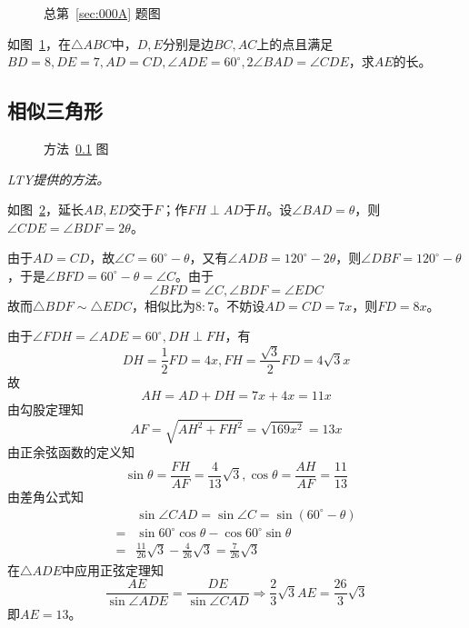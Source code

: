 

\begin{figure}[htbp]
  \centering {}
  \caption{总第~\ref{sec:000A} 题图} \label{fig:000A}
\end{figure}

如图~\ref{fig:000A}，在$\triangle ABC$中，$D, E$分别是边$BC, AC$上的点且满足$BD = 8, DE = 7, AD = CD, \angle ADE = 60^\circ, 2\angle BAD = \angle CDE$，求$AE$的长。



\subsection{相似三角形} \label{subsec:000A-sim}

\begin{figure}[htbp]
  \centering {}
  \caption{方法~\ref{subsec:000A-sim} 图} \label{fig:000A-sim}
\end{figure}

\emph{LTY提供的方法。}

如图~\ref{fig:000A-sim}，延长$AB, ED$交于$F$；作$FH \perp AD$于$H$。设$\angle BAD = \theta$，则$\angle CDE = \angle BDF = 2\theta$。

由于$AD = CD$，故$\angle C = 60^\circ - \theta$，又有$\angle ADB = 120^\circ - 2\theta$，则$\angle DBF = 120^\circ - \theta$，于是$\angle BFD = 60^\circ - \theta = \angle C$。由于
\[ \angle BFD = \angle C, \angle BDF = \angle EDC \]
故而$\triangle BDF \sim \triangle EDC$，相似比为$8:7$。不妨设$AD = CD = 7x$，则$FD = 8x$。

由于$\angle FDH = \angle ADE = 60^\circ, DH \perp FH$，有
\[ DH = \frac12FD = 4x, FH = \frac{\sqrt3}2FD = 4\sqrt3x \]
故
\[ AH = AD + DH = 7x + 4x = 11x \]
由勾股定理知
\[ AF = \sqrt{AH^2 + FH^2} = \sqrt{169x^2} = 13x \]
由正余弦函数的定义知
\[ \sin\theta = \frac{FH}{AF} = \frac4{13}\sqrt3, \cos\theta = \frac{AH}{AF} = \frac{11}{13} \]
由差角公式知
\begin{align*}
  & \sin\angle CAD = \sin\angle C = \sin(60^\circ - \theta) \\
  ={}& \sin60^\circ\cos\theta - \cos60^\circ\sin\theta \\
  ={}& \frac{11}{26}\sqrt3 - \frac4{26}\sqrt3 = \frac7{26}\sqrt3
\end{align*}
在$\triangle ADE$中应用正弦定理知
\[ \frac{AE}{\sin\angle ADE} = \frac{DE}{\sin\angle CAD} \Rightarrow \frac23\sqrt3AE = \frac{26}3\sqrt3 \]
即$AE = 13$。

